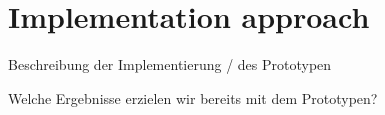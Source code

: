 \section{Implementation approach}
\label{sec:implementation_approach}
Beschreibung der Implementierung / des Prototypen

Welche Ergebnisse erzielen wir bereits mit dem Prototypen?